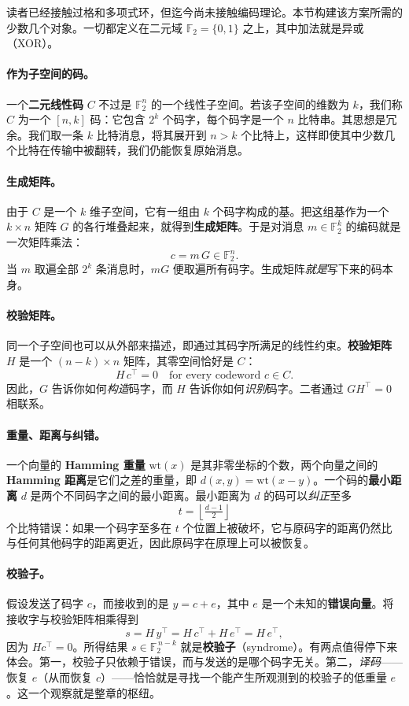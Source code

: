 读者已经接触过格和多项式环，但迄今尚未接触编码理论。本节构建该方案所需的少数几个对象。一切都定义在二元域 $\mathbb{F}_2 = \{0,1\}$ 之上，其中加法就是异或（XOR）。

\paragraph{作为子空间的码。}
一个\textbf{二元线性码} $C$ 不过是 $\mathbb{F}_2^n$ 的一个线性子空间。若该子空间的维数为 $k$，我们称 $C$ 为一个 $[n,k]$ 码：它包含 $2^k$ 个码字，每个码字是一个 $n$ 比特串。其思想是冗余。我们取一条 $k$ 比特消息，将其展开到 $n > k$ 个比特上，这样即使其中少数几个比特在传输中被翻转，我们仍能恢复原始消息。

\paragraph{生成矩阵。}
由于 $C$ 是一个 $k$ 维子空间，它有一组由 $k$ 个码字构成的基。把这组基作为一个 $k \times n$ 矩阵 $G$ 的各行堆叠起来，就得到\textbf{生成矩阵}。于是对消息 $m \in \mathbb{F}_2^k$ 的编码就是一次矩阵乘法：
\[
c = m\,G \in \mathbb{F}_2^n .
\]
当 $m$ 取遍全部 $2^k$ 条消息时，$mG$ 便取遍所有码字。生成矩阵\emph{就是}写下来的码本身。

\paragraph{校验矩阵。}
同一个子空间也可以从外部来描述，即通过其码字所满足的线性约束。\textbf{校验矩阵} $H$ 是一个 $(n-k) \times n$ 矩阵，其零空间恰好是 $C$：
\[
H\,c^\top = 0 \quad\text{for every codeword } c \in C .
\]
因此，$G$ 告诉你如何\emph{构造}码字，而 $H$ 告诉你如何\emph{识别}码字。二者通过 $G H^\top = 0$ 相联系。

\paragraph{重量、距离与纠错。}
一个向量的 \textbf{Hamming 重量} $\mathrm{wt}(x)$ 是其非零坐标的个数，两个向量之间的 \textbf{Hamming 距离}是它们之差的重量，即 $d(x,y) = \mathrm{wt}(x-y)$。一个码的\textbf{最小距离} $d$ 是两个不同码字之间的最小距离。最小距离为 $d$ 的码可以\emph{纠正}至多
\[
t = \left\lfloor \tfrac{d-1}{2} \right\rfloor
\]
个比特错误：如果一个码字至多在 $t$ 个位置上被破坏，它与原码字的距离仍然比与任何其他码字的距离更近，因此原码字在原理上可以被恢复。

\paragraph{校验子。}
假设发送了码字 $c$，而接收到的是 $y = c + e$，其中 $e$ 是一个未知的\textbf{错误向量}。将接收字与校验矩阵相乘得到
\[
s = H\,y^\top = H\,c^\top + H\,e^\top = H\,e^\top ,
\]
因为 $Hc^\top = 0$。所得结果 $s \in \mathbb{F}_2^{\,n-k}$ 就是\textbf{校验子}（syndrome）。有两点值得停下来体会。第一，校验子只依赖于错误，而与发送的是哪个码字无关。第二，\emph{译码}——恢复 $e$（从而恢复 $c$）——恰恰就是寻找一个能产生所观测到的校验子的低重量 $e$。这一个观察就是整章的枢纽。

